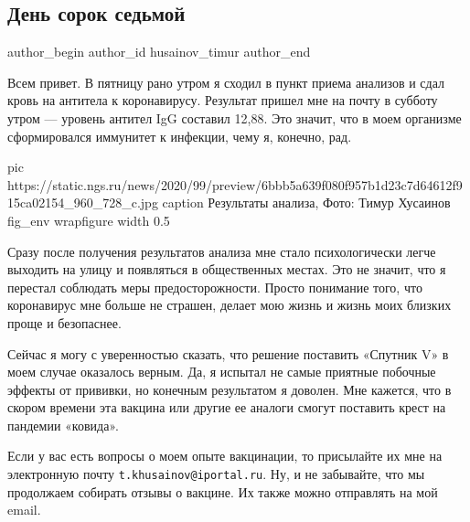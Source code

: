  
 
 
 
 
 
\subsection{День сорок седьмой}
\label{sec:14_12_2020.news.ru.59.husainov_timur.1.den_47}
\ifcmt
	author_begin
   author_id husainov_timur
	author_end
\fi


Всем привет. В пятницу рано утром я сходил в пункт приема анализов и сдал кровь
на антитела к коронавирусу. Результат пришел мне на почту в субботу утром —
уровень антител IgG составил 12,88. Это значит, что в моем организме
сформировался иммунитет к инфекции, чему я, конечно, рад.

\ifcmt
  pic https://static.ngs.ru/news/2020/99/preview/6bbb5a639f080f957b1d23c7d64612f915ca02154_960_728_c.jpg
	caption Результаты анализа, Фото: Тимур Хусаинов
	fig_env wrapfigure
	width 0.5
\fi

Сразу после получения результатов анализа мне стало психологически легче
выходить на улицу и появляться в общественных местах. Это не значит, что я
перестал соблюдать меры предосторожности. Просто понимание того, что
коронавирус мне больше не страшен, делает мою жизнь и жизнь моих близких проще
и безопаснее.

Сейчас я могу с уверенностью сказать, что решение поставить «Спутник V» в моем
случае оказалось верным. Да, я испытал не самые приятные побочные эффекты от
прививки, но конечным результатом я доволен. Мне кажется, что в скором времени
эта вакцина или другие ее аналоги смогут поставить крест на пандемии «ковида».

Если у вас есть вопросы о моем опыте вакцинации, то присылайте их мне на
электронную почту \verb|t.khusainov@iportal.ru|. Ну, и не забывайте, что мы продолжаем
собирать отзывы о вакцине. Их также можно отправлять на мой email.

